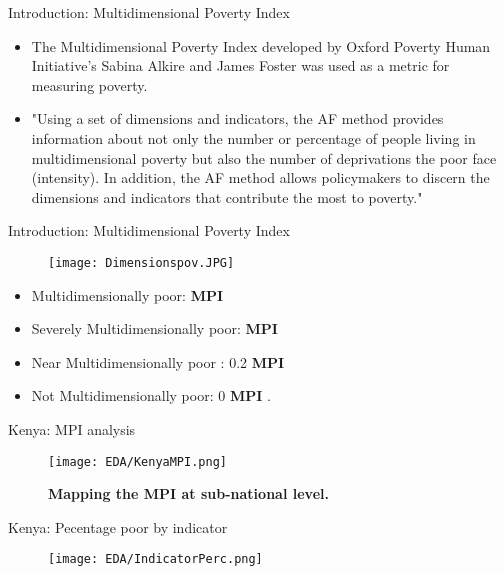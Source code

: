 \documentclass[10pt]{beamer}
\begin{document}
\begin{frame}{Introduction: Multidimensional Poverty Index}
\begin{itemize}
    \item The Multidimensional Poverty Index developed by Oxford Poverty Human Initiative's Sabina Alkire and James Foster was used as a metric for measuring poverty.
    \item "Using a set of dimensions and indicators, the AF method provides information about not only the number or percentage of people living in multidimensional poverty but also the number of deprivations the poor face (intensity). In addition, the AF method allows policymakers to discern the dimensions and indicators that contribute the most to poverty."
\end{itemize}

\end{frame}

\begin{frame}{Introduction: Multidimensional Poverty Index}

\begin{figure}
    \centering
    \texttt{[image: Dimensionspov.JPG]}
\end{figure}
\begin{itemize}
    \item Multidimensionally poor: \textbf{MPI}  \\
    \item Severely Multidimensionally poor: \textbf{MPI}  \\
    \item Near Multidimensionally poor : 0.2 \le \textbf{MPI}  \\
    \item Not Multidimensionally poor: 0 \le \textbf{MPI} . \\
\end{itemize}
\end{frame}


\begin{frame}{Kenya: MPI analysis}
\begin{figure}
    \centering
    \texttt{[image: EDA/KenyaMPI.png]}
    \caption{\textbf{Mapping the MPI at sub-national level.}}
\end{figure}
\end{frame}

\begin{frame}{Kenya: Pecentage poor by indicator}
   \begin{figure}
    \centering
    \texttt{[image: EDA/IndicatorPerc.png]}
\end{figure}
\end{frame}
\end{document}
